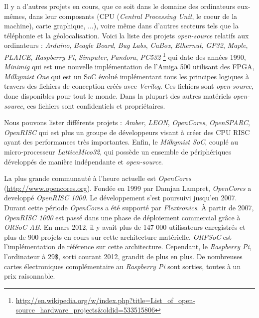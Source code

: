 Il y a d'autres projets en cours, que ce soit dans le domaine des ordinateurs eux-mêmes, dans leur composants (CPU (\textit{Central Processing Unit}, le coeur de la machine), carte graphique, ...), voire même dans d'autres secteurs tels que la téléphonie et la géolocalisation. Voici la liste des projets \textit{open-source} relatifs aux ordinateurs : \textit{Arduino}, \textit{Beagle Board}, \textit{Bug Labs}, \textit{CuBox}, \textit{Ethernut}, \textit{GP32}, \textit{Maple}, \textit{PLAICE}, \textit{Raspberry Pi}, \textit{Simputer}, \textit{Pandora}, \textit{PC532} \footnote{\url{http://en.wikipedia.org/w/index.php?title=List_of_open-source_hardware_projects\&oldid=533515806}}
qui date des années 1990, \textit{Minimig} qui est une nouvelle implémentation de l'Amiga 500 utilisant des FPGA, \textit{Milkymist One} qui est un SoC évolué implémentant tous les principes logiques à travers des fichiers de conception créés avec \textit{Verilog}. Ces fichiers sont \textit{open-source}, donc disponibles pour tout le monde. Dans la plupart des autres matériels \textit{open-source}, ces fichiers sont confidentiels et propriétaires.

Nous pouvons lister différents projets : \textit{Amber}, \textit{LEON}, \textit{OpenCores}, \textit{OpenSPARC}, \textit{OpenRISC} qui est plus un groupe de développeurs visant à créer des CPU RISC ayant des performances très importantes. Enfin, le \textit{Milkymist SoC}, couplé au micro-processeur \textit{LatticeMico32}, qui possède un ensemble de périphériques développés de manière indépendante et \textit{open-source}.

La plus grande communauté à l'heure actuelle est \textit{OpenCores} (\url{http://www.opencores.org}). Fondée en 1999 par Damjan Lampret, \textit{OpenCores} a developpé \textit{OpenRISC 1000}. Le développement s'est poursuivi jusqu'en 2007. Durant cette période \textit{OpenCores} a été supporté par \textit{Flextronics}. À partir de 2007, \textit{OpenRISC 1000} est passé dans une phase de déploiement commercial grâce à \textit{ORSoC AB}. En mars 2012, il y avait plus de 147 000 utilisateurs enregistrés et plus de 900 projets en cours sur cette architecture matérielle. \textit{ORPSoC} est l'implémentation de référence sur cette architecture. Cependant, le \textit{Raspberry Pi}, l'ordinateur à 29\$, sorti courant 2012, grandit de plus en plus. De nombreuses cartes électroniques complémentaire au \textit{Raspberry Pi} sont sorties, toutes à un prix raisonnable.



